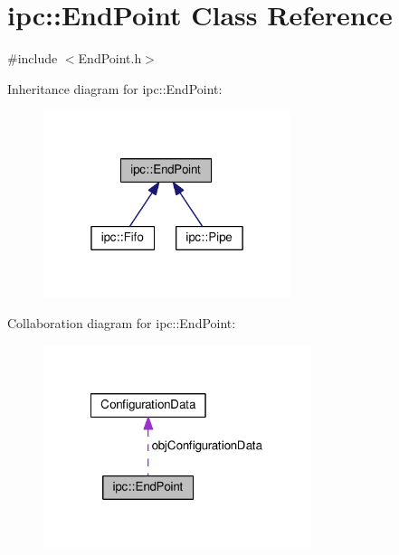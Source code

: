 \hypertarget{classipc_1_1EndPoint}{}\section{ipc\+:\+:End\+Point Class Reference}
\label{classipc_1_1EndPoint}


{\ttfamily \#include $<$End\+Point.\+h$>$}



Inheritance diagram for ipc\+:\+:End\+Point\+:
\nopagebreak
\begin{figure}[H]
\begin{center}
\leavevmode
\includegraphics[width=205pt]{classipc_1_1EndPoint__inherit__graph}
\end{center}
\end{figure}


Collaboration diagram for ipc\+:\+:End\+Point\+:
\nopagebreak
\begin{figure}[H]
\begin{center}
\leavevmode
\includegraphics[width=222pt]{classipc_1_1EndPoint__coll__graph}
\end{center}
\end{figure}
